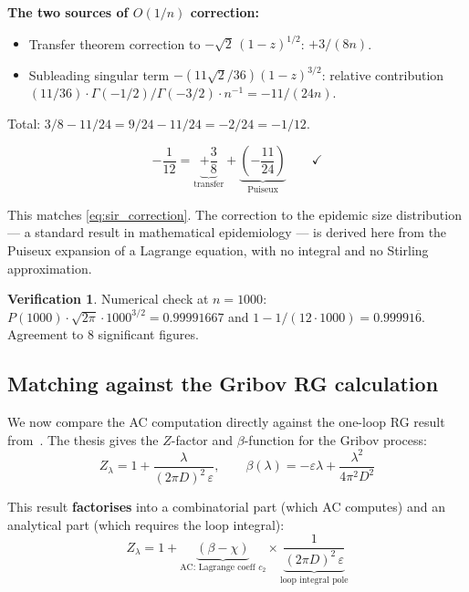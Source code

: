 \documentclass[11pt,a4paper]{article}
\theoremstyle{definition}
\newtheorem*{verification}{Verification}
\begin{document}
\textbf{The two sources of $O(1/n)$ correction:}
\begin{itemize}
\item Transfer theorem correction to $-\sqrt{2}\,(1{-}z)^{1/2}$: $+3/(8n)$.
\item Subleading singular term $-(11\sqrt{2}/36)(1{-}z)^{3/2}$:
      relative contribution $(11/36) \cdot \Gamma(-1/2)/\Gamma(-3/2)
      \cdot n^{-1} = -11/(24n)$.
\end{itemize}
Total: $3/8 - 11/24 = 9/24 - 11/24 = -2/24 = -1/12$.

\begin{equation}
\boxed{-\frac{1}{12} = \underbrace{+\frac{3}{8}}_{\text{transfer}}
+ \underbrace{\left(-\frac{11}{24}\right)}_{\text{Puiseux}} \qquad\checkmark}
\end{equation}

This matches \eqref{eq:sir_correction}. The correction to the epidemic
size distribution --- a standard result in mathematical epidemiology ---
is derived here from the Puiseux expansion of a Lagrange equation, with
no integral and no Stirling approximation.

\begin{verification}
Numerical check at $n = 1000$:
$P(1000) \cdot \sqrt{2\pi} \cdot 1000^{3/2} = 0.99991667$
and $1 - 1/(12 \cdot 1000) = 0.99991\overline{6}$.
Agreement to 8 significant figures. \checkmark
\end{verification}

\subsection{Matching against the Gribov RG calculation}

We now compare the AC computation directly against the one-loop RG result
from~\cite{amarteifio2019}. The thesis gives the $Z$-factor and
$\beta$-function for the Gribov process:
\begin{equation}
Z_\lambda = 1 + \frac{\lambda}{(2\pi D)^2\,\varepsilon},
\qquad
\beta(\lambda) = -\varepsilon\lambda + \frac{\lambda^2}{4\pi^2 D^2}
\label{eq:gribov_rg}
\end{equation}

This result \textbf{factorises} into a combinatorial part (which AC
computes) and an analytical part (which requires the loop integral):
\[
Z_\lambda = 1 + \underbrace{(\beta - \chi)}_{\text{AC: Lagrange coeff } c_2}
\times \underbrace{\frac{1}{(2\pi D)^2\,\varepsilon}}_{\text{loop integral pole}}
\]
\end{document}
